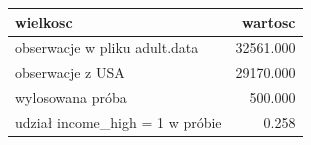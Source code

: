 \begin{tabular}{lr}
  \hline
wielkosc & wartosc \\ 
  \hline
obserwacje w pliku adult.data & 32561.000 \\ 
  obserwacje z USA & 29170.000 \\ 
  wylosowana próba & 500.000 \\ 
  udział income\_high = 1 w próbie & 0.258 \\ 
   \hline
\end{tabular}
